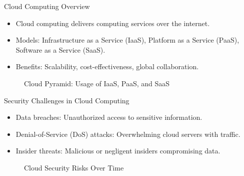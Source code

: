\documentclass{beamer}
\begin{document}
\begin{frame}{Cloud Computing Overview}
\begin{itemize}
    \item Cloud computing delivers computing services over the internet.
    \item Models: Infrastructure as a Service (IaaS), Platform as a Service (PaaS), Software as a Service (SaaS).
    \item Benefits: Scalability, cost-effectiveness, global collaboration.
\end{itemize}

\begin{figure}[h]
    \centering
    \caption{Cloud Pyramid: Usage of IaaS, PaaS, and SaaS}
    \label{fig:cloud_pyramid}
\end{figure}
\end{frame}

\begin{frame}{Security Challenges in Cloud Computing}
\begin{itemize}
    \item Data breaches: Unauthorized access to sensitive information.
    \item Denial-of-Service (DoS) attacks: Overwhelming cloud servers with traffic.
    \item Insider threats: Malicious or negligent insiders compromising data.
\end{itemize}

\begin{figure}[h]
    \centering
    \caption{Cloud Security Risks Over Time}
    \label{fig:cloud_security_risks}
\end{figure}
\end{frame}
\end{document}
